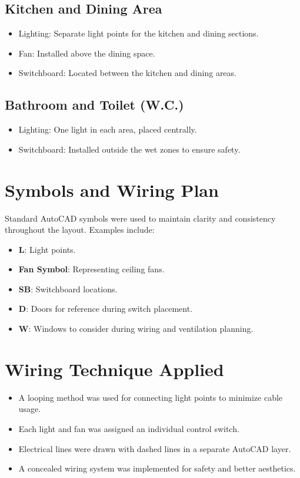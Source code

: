 \documentclass[12pt]{article}
\begin{document}
\subsection*{Kitchen and Dining Area}
\begin{itemize}
    \item Lighting: Separate light points for the kitchen and dining sections.
    \item Fan: Installed above the dining space.
    \item Switchboard: Located between the kitchen and dining areas.
\end{itemize}

\subsection*{Bathroom and Toilet (W.C.)}
\begin{itemize}
    \item Lighting: One light in each area, placed centrally.
    \item Switchboard: Installed outside the wet zones to ensure safety.
\end{itemize}

\section*{Symbols and Wiring Plan}
Standard AutoCAD symbols were used to maintain clarity and consistency throughout the layout. Examples include:

\begin{itemize}
    \item \textbf{L}: Light points.
    \item \textbf{Fan Symbol}: Representing ceiling fans.
    \item \textbf{SB}: Switchboard locations.
    \item \textbf{D}: Doors for reference during switch placement.
    \item \textbf{W}: Windows to consider during wiring and ventilation planning.
\end{itemize}

\section*{Wiring Technique Applied}
\begin{itemize}
    \item A looping method was used for connecting light points to minimize cable usage.
    \item Each light and fan was assigned an individual control switch.
    \item Electrical lines were drawn with dashed lines in a separate AutoCAD layer.
    \item A concealed wiring system was implemented for safety and better aesthetics.
\end{itemize}
\end{document}
